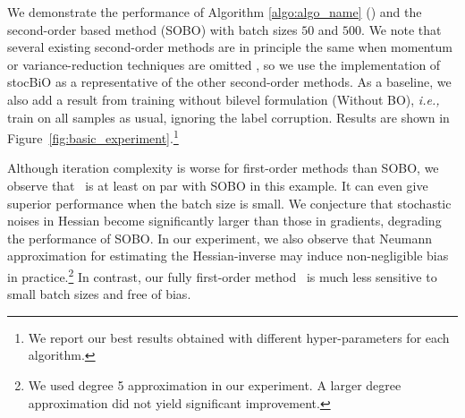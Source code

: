 We demonstrate the performance of Algorithm \ref{algo:algo_name} (\algname) %
and the second-order based method (SOBO) with batch sizes $50$ and $500$. 
We note that several existing second-order methods are in principle the same when momentum or variance-reduction techniques are omitted \cite{ghadimi2018approximation, hong2020two, chen2021closing}, so we use the implementation of stocBiO \cite{ji2021bilevel} as a representative of the other second-order methods.
As a baseline, we also add a result from training without bilevel formulation (Without BO), {\it i.e.,} train on all samples as usual, ignoring the label corruption. 
Results are shown in Figure~\ref{fig:basic_experiment}.\footnote{We report our best results obtained with different hyper-parameters for each algorithm. }

Although iteration complexity is worse for first-order methods than SOBO, we observe that \algname~is at least on par with SOBO in this example. 
It can even give superior performance when the batch size is small. 
We conjecture that stochastic noises in Hessian become significantly larger than those in gradients, degrading the performance of SOBO. 
In our experiment, we also observe that Neumann approximation \cite{ghadimi2018approximation} for estimating the Hessian-inverse may induce non-negligible bias in practice.\footnote{We used degree 5 approximation in our experiment. A larger degree approximation did not yield significant improvement.}
In contrast, our fully first-order method \algname~is much less sensitive to small batch sizes and free of bias. 



